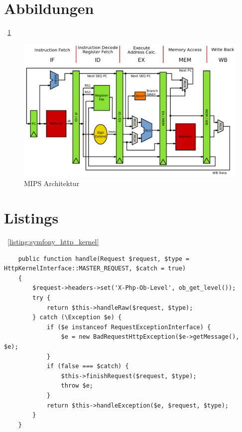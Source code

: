 \section{Abbildungen}
\figurename\ \ref{fig:mips_architektur}

\begin{figure}[H]
    \centering
    \includegraphics[width=1.0\textwidth]{medien/mips_architecture}
    \caption{MIPS Architektur}
    \label{fig:mips_architektur}
\end{figure}


\section{Listings}

\listingname\ \ref{listing:symfony_http_kernel}

\begin{code}
    \label{listing:symfony_http_kernel}
    \begin{verbatim}
    public function handle(Request $request, $type = HttpKernelInterface::MASTER_REQUEST, $catch = true)
    {
        $request->headers->set('X-Php-Ob-Level', ob_get_level());
        try {
            return $this->handleRaw($request, $type);
        } catch (\Exception $e) {
            if ($e instanceof RequestExceptionInterface) {
                $e = new BadRequestHttpException($e->getMessage(), $e);
            }
            if (false === $catch) {
                $this->finishRequest($request, $type);
                throw $e;
            }
            return $this->handleException($e, $request, $type);
        }
    }
    \end{verbatim}
\end{code}
